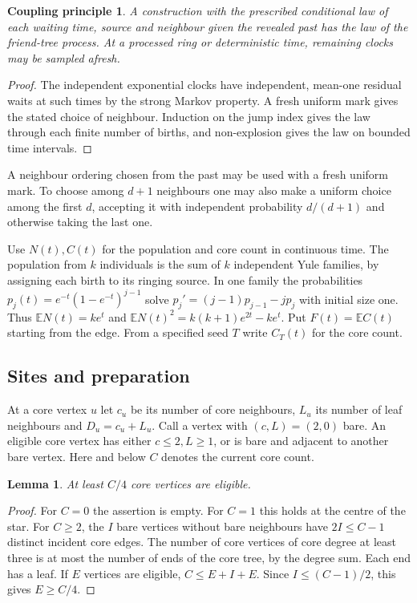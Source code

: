 \documentclass[11pt]{article}
\newtheorem{lemma}{Lemma}[section]
\newtheorem*{couplingfact}{Coupling principle}
\theoremstyle{remark}
\numberwithin{equation}{section}
\newcommand{\E}{\mathbb E}
\begin{document}
\begin{couplingfact}
A construction with the prescribed conditional law of each waiting time, source
and neighbour given the revealed past has the law of the friend-tree process.
At a processed ring or deterministic time, remaining clocks may be sampled afresh.
\end{couplingfact}
\begin{proof}
The independent exponential clocks have independent, mean-one residual waits at such times by the strong Markov property. A fresh uniform mark gives the stated choice of neighbour. Induction on the jump index gives the law through each finite number of births, and non-explosion gives the law on bounded time intervals.
\end{proof}
A neighbour ordering chosen from the past may be used with a fresh
uniform mark. To choose among $d+1$ neighbours one may also make a
uniform choice among the first $d$, accepting it with independent probability
$d/(d+1)$ and otherwise taking the last one.

Use $N(t),C(t)$ for the population and core count in continuous time. The population from $k$ individuals is the sum of $k$ independent Yule families, by assigning each birth to its ringing source. In one family the probabilities $p_j(t)=e^{-t}(1-e^{-t})^{j-1}$ solve $p_j'=(j-1)p_{j-1}-jp_j$ with initial size one. Thus $\E N(t)=ke^t$ and $\E N(t)^2=k(k+1)e^{2t}-ke^t$. Put $F(t)=\E C(t)$ starting from the edge. From a specified seed $T$ write $C_T(t)$ for the core count.

\subsection{Sites and preparation}
At a core vertex $u$ let $c_u$ be its number of core neighbours, $L_u$ its number of leaf neighbours and $D_u=c_u+L_u$. Call a vertex with $(c,L)=(2,0)$ bare. An eligible core vertex has either $c\le2,L\ge1$, or is bare and adjacent to another bare vertex. Here and below $C$ denotes the current core count.
\begin{lemma}\label{lem:eligible} At least $C/4$ core vertices are eligible.\end{lemma}
\begin{proof}
For $C=0$ the assertion is empty. For $C=1$ this holds at the centre of the star. For $C\ge2$, the $I$ bare vertices without bare neighbours have $2I\le C-1$ distinct incident core edges. The number of core vertices of core degree at least three is at most the number of ends of the core tree, by the degree sum. Each end has a leaf. If $E$ vertices are eligible, $C\le E+I+E$. Since $I\le(C-1)/2$, this gives $E\ge C/4$.\end{proof}
\end{document}
